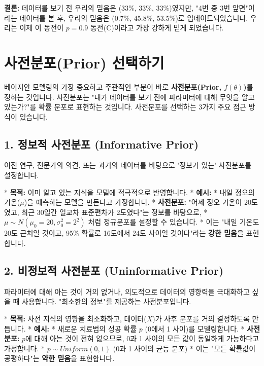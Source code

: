 \documentclass[11pt,a4paper]{book}
\theoremstyle{definition}
\begin{document}
\begin{examplebox}[title={동전 뒤집기 예제 (이산 확률)}]
    \textbf{결론:} 데이터를 보기 전 우리의 믿음은 (33\%, 33\%, 33\%)였지만,
    "4번 중 3번 앞면"이라는 데이터를 본 후, 우리의 믿음은 (0.7\%, 45.8\%, 53.5\%)로 업데이트되었습니다.
    우리는 이제 이 동전이 $p=0.9$ 동전(C)이라고 가장 강하게 믿게 되었습니다.
\end{examplebox}


\section{사전분포(Prior) 선택하기}

베이지안 모델링의 가장 중요하고 주관적인 부분이 바로 \textbf{사전분포(Prior, $f(\theta)$)}를 정하는 것입니다.
사전분포는 "내가 데이터를 보기 전에 파라미터에 대해 무엇을 알고 있는가?"를 확률 분포로 표현하는 것입니다.
사전분포를 선택하는 3가지 주요 접근 방식이 있습니다.

\subsection{1. 정보적 사전분포 (Informative Prior)}

이전 연구, 전문가의 의견, 또는 과거의 데이터를 바탕으로 '정보가 있는' 사전분포를 설정합니다.

* \textbf{목적:} 이미 알고 있는 지식을 모델에 적극적으로 반영합니다.
* \textbf{예시:}
    * 내일 정오의 기온($\mu$)을 예측하는 모델을 만든다고 가정합니다.
    * \textbf{사전분포:} "어제 정오 기온이 20도였고, 최근 30일간 일교차 표준편차가 2도였다"는 정보를 바탕으로,
    * $\mu \sim N(\mu_0=20, \sigma_0^2=2^2)$ 처럼 정규분포를 설정할 수 있습니다.
    * 이는 "내일 기온도 20도 근처일 것이고, 95\% 확률로 16도에서 24도 사이일 것이다"라는 \textbf{강한 믿음}을 표현합니다.

\subsection{2. 비정보적 사전분포 (Uninformative Prior)}

파라미터에 대해 아는 것이 거의 없거나, 의도적으로 데이터의 영향력을 극대화하고 싶을 때 사용합니다.
"최소한의 정보"를 제공하는 사전분포입니다.

* \textbf{목적:} 사전 지식의 영향을 최소화하고, 데이터($X$)가 사후 분포를 거의 결정하도록 만듭니다.
* \textbf{예시:}
    * 새로운 치료법의 성공 확률 $p$ (0에서 1 사이)를 모델링합니다.
    * \textbf{사전분포:} $p$에 대해 아는 것이 전혀 없으므로, 0과 1 사이의 모든 값이 동일하게 가능하다고 가정합니다.
    * $p \sim Uniform(0, 1)$ (0과 1 사이의 균등 분포)
    * 이는 "모든 확률값이 공평하다"는 \textbf{약한 믿음}을 표현합니다.
\end{document}
